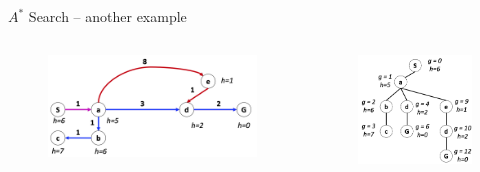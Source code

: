 \documentclass{beamer}
\begin{document}
\begin{frame}{$A^*$ Search -- another example}
\begin{columns}
    \begin{column}{.6\textwidth}
        \begin{figure}[htpb]
            \centering
            \includegraphics[width=1\linewidth]{pic/astar.png}
        \end{figure}
    \end{column}

    \begin{column}{.4\textwidth}
        \begin{figure}[htpb]
            \centering
            \includegraphics[width=1\linewidth]{pic/astarttree.png}
        \end{figure}
    \end{column}
\end{columns}
\end{frame}
\end{document}
